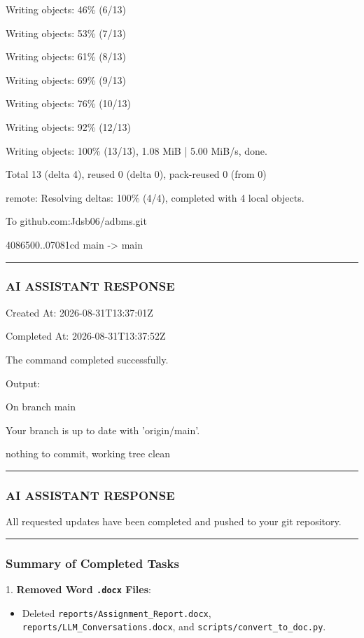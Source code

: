 \documentclass[11pt,a4paper]{article}
\begin{document}
{Writing objects:  46\% (6/13)

Writing objects:  53\% (7/13)

Writing objects:  61\% (8/13)

Writing objects:  69\% (9/13)

Writing objects:  76\% (10/13)

Writing objects:  92\% (12/13)

Writing objects: 100\% (13/13), 1.08 MiB | 5.00 MiB/s, done.

Total 13 (delta 4), reused 0 (delta 0), pack-reused 0 (from 0)

remote: Resolving deltas: 100\% (4/4), completed with 4 local objects.

To github.com:Jdsb06/adbms.git

4086500..07081cd  main -> main


\hrule

\subsubsection{AI ASSISTANT RESPONSE}

Created At: 2026-08-31T13:37:01Z

Completed At: 2026-08-31T13:37:52Z


The command completed successfully.

Output:

On branch main

Your branch is up to date with 'origin/main'.

nothing to commit, working tree clean


\hrule

\subsubsection{AI ASSISTANT RESPONSE}

All requested updates have been completed and pushed to your git repository.


\hrule


\subsubsection{Summary of Completed Tasks}

1. \textbf{Removed Word \texttt{.docx} Files}:

\begin{itemize}
\item Deleted \texttt{reports/Assignment\_Report.docx}, \texttt{reports/LLM\_Conversations.docx}, and \texttt{scripts/convert\_to\_doc.py}.
\end{itemize}

}
\end{document}
